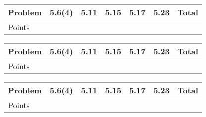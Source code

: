\documentclass{fkletter}
\begin{document}
\begin{table}[H]
  \centering
  \begin{tabular}{lcccccr} \toprule
    Problem & 5.6(4) & 5.11 & 5.15 & 5.17 & 5.23 & Total \\
    \midrule
    Points & \\\bottomrule
  \end{tabular}
\end{table}
\begin{table}[H]
  \centering
  \begin{tabular}{lcccccr} \toprule
    Problem & 5.6(4) & 5.11 & 5.15 & 5.17 & 5.23 & Total \\
    \midrule
    Points & \\\bottomrule
  \end{tabular}
\end{table}
\begin{table}[H]
  \centering
  \begin{tabular}{lcccccr} \toprule
    Problem & 5.6(4) & 5.11 & 5.15 & 5.17 & 5.23 & Total \\
    \midrule
    Points & \\\bottomrule
  \end{tabular}
\end{table}
\end{document}
